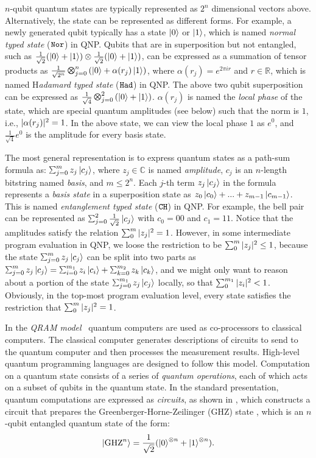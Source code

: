  $n$-qubit quantum states are typically represented as $2^n$ dimensional vectors above. Alternatively, the state can be represented as different forms. For example, a newly generated qubit typically has a state $\left\vert{0}\right\rangle$ or $\left\vert{1}\right\rangle$, which is named \textit{normal typed state} ($\texttt{Nor}$) in QNP. Qubits that are in superposition but not entangled, such as $\frac{1}{\sqrt{2}}(\left\vert{0}\right\rangle + \left\vert{1}\right\rangle)\otimes \frac{1}{\sqrt{2}}(\left\vert{0}\right\rangle + \left\vert{1}\right\rangle)$, can be expressed as a summation of tensor products as $\shad{2^n}{n}{\alpha(r_j)}$, where $\alpha(r_j)=e^{2\pi i r}$ and $r \in \mathbb{R}$, which is named H\textit{adamard typed state} ($\texttt{Had}$) in QNP. The above two qubit superposition can be expressed as $\shad{4}{2}{}$.
$\alpha(r_j)$ is named the \emph{local phase} of the state, which are special quantum amplitudes (see below) such that the norm is $1$, i.e., $|\alpha(r_j)|^2=1$. In the above state, we can view the local phase $1$ as $e^{0}$, and $\frac{1}{\sqrt{4}}e^{0}$ is the amplitude for every basis state.

The most general representation is to express quantum states as a path-sum formula as: $\sch{m}{z_j}{c_j}$, where $z_j\in \mathbb{C}$ is named \emph{amplitude}, $c_j$ is an $n$-length bitstring named \emph{basis}, and $m \le 2^n$. Each $j$-th term ${z_j}\left\vert{c_j}\right\rangle$ in the formula represents a \emph{basis state} in a superposition state as ${z_0}\left\vert{c_0}\right\rangle+...+{z_{m-1}}\left\vert{c_{m-1}}\right\rangle$. 
This is named \textit{entanglement typed state} ($\texttt{CH}$) in QNP.
For example, the bell pair can be represented as $\sch{2}{\frac{1}{\sqrt{2}}}{c_j}$ with $c_0=00$ and $c_1=11$.
Notice that the amplitudes satisfy the relation $\sum_{0}^{m}|z_j|^2 = 1$. However, in some intermediate program evaluation in QNP, we loose the restriction to be $\sum_{0}^{m}|z_j|^2 \le 1$, because the state $\sch{m}{z_j}{c_j}$ can be split into two parts as $\sch{m}{z_j}{c_j}=\schii{m_1}{z_i}{c_i}+\schk{m_2}{z_k}{c_k}$, and we might only want to reason about a portion of the state $\sch{m_1}{z_j}{c_j}$ locally, so that $\sum_{0}^{m_1}|z_i|^2 < 1$. Obviously, in the top-most program evaluation level, every state satisfies the restriction that $\sum_{0}^{m}|z_j|^2 = 1$.

 In the \emph{QRAM model}~\cite{Knill1996} quantum computers are used as co-processors to classical computers. The classical computer generates descriptions of circuits to send to the quantum computer and then processes the measurement results. High-level quantum programming languages are designed to follow this model.
Computation on a quantum state consists of a series of \emph{quantum operations}, each of which acts on a subset of qubits in the quantum state. In the standard presentation, quantum computations are expressed as \emph{circuits}, as shown in , which constructs a circuit that prepares the Greenberger-Horne-Zeilinger (GHZ) state \cite{Greenberger1989}, which is an $n$-qubit entangled quantum state of the form:
\begin{align*}
    \left\vert{\text{GHZ}^n}\right\rangle = \frac{1}{\sqrt{2}}(\left\vert{0}\right\rangle^{\otimes n}+\left\vert{1}\right\rangle^{\otimes n}).
\end{align*}

